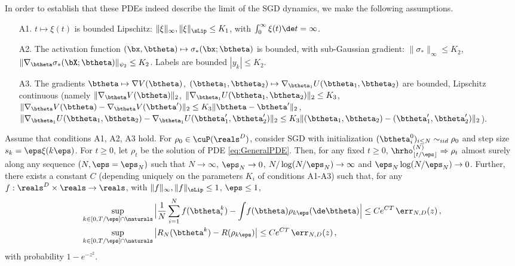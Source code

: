 \documentclass{article}
\begin{document}
In order to establish that these PDEs indeed describe the limit of the SGD dynamics, we make the following assumptions.
%
\begin{itemize}
%
\item[{\sf A1.}] $t\mapsto \xi(t)$ is bounded Lipschitz: $\|\xi\|_{\infty}, \|\xi\|_{\sLip}\le K_1$, with $\int_0^{\infty}\xi(t) \de t=\infty$.
%
\item[{\sf A2.}] The activation function $(\bx,\btheta)\mapsto \sigma_*(\bx;\btheta)$ is bounded, with sub-Gaussian gradient: $\|\sigma_*\|_{\infty}\le K_2$, $\|\nabla_{\btheta}
\sigma_*(\bX;\btheta)\|_{\psi_2}\le K_2$. Labels are bounded $|y_k|\le K_2$.
%
\item[{\sf A3.}] The gradients $\btheta\mapsto \nabla V(\btheta)$, $(\btheta_1,\btheta_2)\mapsto \nabla_{\btheta_1}U(\btheta_1,\btheta_2)$  are bounded, Lipschitz continuous 
(namely $\| \nabla_{\btheta}V(\btheta) \|_2$, $\|\nabla_{\btheta_1}U(\btheta_1,\btheta_2)\|_2\le K_3$, $\|\nabla_{\btheta}V(\btheta)-\nabla_{\btheta}V(\btheta')\|_2\le K_3 \|\btheta-\btheta'\|_2$, $\|\nabla_{\btheta_1}U(\btheta_1,\btheta_2)-\nabla_{\btheta_1}U(\btheta'_1,\btheta_2')\|_2\le K_3 \|(\btheta_1,\btheta_2)-
(\btheta_1',\btheta_2')\|_2$).
%
\end{itemize}

\begin{theorem}[PM. Nguyen et al. (2018)]\label{thm: mean field nguyen}
Assume that conditions {\sf A1}, {\sf A2}, {\sf A3} hold.
For $\rho_0\in\cuP(\reals^D)$, consider SGD with initialization $(\btheta^0_i)_{i\le N}\sim_{iid}\rho_0$ and step size $s_k = \eps \xi(k \eps)$. For $t\ge 0$, let $\rho_t$ be the solution of PDE \eqref{eq:GeneralPDE}.
Then, for any fixed $t \ge 0$,  $\hrho^{(N)}_{\lfloor t / \eps \rfloor} \Rightarrow \rho_{t}$ almost surely along any sequence $(N,\eps = \eps_N)$ such that $N \to \infty$, $\eps_N \to 0$, $N/\log (N/\eps_N) \to\infty$ and $\eps_N \log(N / \eps_N)\to 0$.
Further, there exists a constant $C$  (depending uniquely on the parameters $K_i$ of conditions {\sf A1}-{\sf A3}) such that,
for any $f:\reals^D\times \reals\to\reals$, with $\|f\|_{\infty}, \|f\|_{\sLip}\le 1$, $\eps\le 1$,
%
\begin{align}
%
&\sup_{k \in  [0, T/\eps] \cap \naturals}\Big|\frac{1}{N}\sum_{i=1}^Nf(\btheta^{k}_i)- \int\!
  f(\btheta)  \rho_{k\eps}(\de \btheta) \Big| \le Ce^{CT}\,\err_{N,D}(z)\, ,\nonumber\\
&\sup_{k \in  [0, T/\eps] \cap \naturals}\big|R_{N}(\btheta^{k})-R(\rho_{k\eps})\big| \le Ce^{CT}\,\err_{N,D}(z)\, ,
%
\end{align} 
%
with probability $1- e^{-z^2}$.
\end{theorem}
\end{document}
